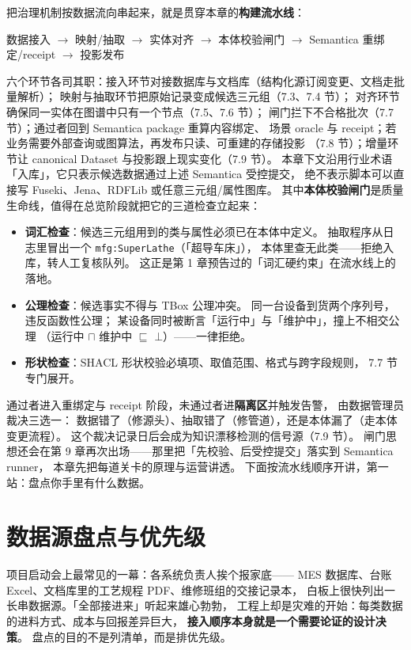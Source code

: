 把治理机制按数据流向串起来，就是贯穿本章的\textbf{构建流水线}：

\begin{center}
数据接入 \(\rightarrow\) 映射/抽取 \(\rightarrow\) 实体对齐 \(\rightarrow\)
本体校验闸门 \(\rightarrow\) Semantica 重绑定/receipt \(\rightarrow\) 投影发布
\end{center}

六个环节各司其职：接入环节对接数据库与文档库（结构化源订阅变更、文档走批量解析）；
映射与抽取环节把原始记录变成候选三元组（7.3、7.4 节）；
对齐环节确保同一实体在图谱中只有一个节点（7.5、7.6 节）；
闸门拦下不合格批次（7.7 节）；通过者回到 Semantica package 重算内容绑定、
场景 oracle 与 receipt；若业务需要外部查询或图算法，再发布只读、可重建的存储投影
（7.8 节）；增量环节让 canonical Dataset 与投影跟上现实变化（7.9 节）。
本章下文沿用行业术语「入库」，它只表示候选数据通过上述 Semantica 受控提交，
绝不表示脚本可以直接写 Fuseki、Jena、RDFLib 或任意三元组/属性图库。
其中\textbf{本体校验闸门}是质量生命线，值得在总览阶段就把它的三道检查立起来：

\begin{itemize}
\item \textbf{词汇检查}：候选三元组用到的类与属性必须已在本体中定义。
  抽取程序从日志里冒出一个 \texttt{mfg:SuperLathe}（「超导车床」），
  本体里查无此类——拒绝入库，转人工复核队列。
  这正是第 1 章预告过的「词汇硬约束」在流水线上的落地。
\item \textbf{公理检查}：候选事实不得与 TBox 公理冲突。
  同一台设备到货两个序列号，违反函数性公理；
  某设备同时被断言「运行中」与「维护中」，撞上不相交公理
  （运行中 \(\sqcap\) 维护中 \(\sqsubseteq\) \(\bot\)）——一律拒绝。
\item \textbf{形状检查}：SHACL 形状校验必填项、取值范围、格式与跨字段规则，
  7.7 节专门展开。
\end{itemize}

通过者进入重绑定与 receipt 阶段，未通过者进\textbf{隔离区}并触发告警，
由数据管理员裁决三选一：
数据错了（修源头）、抽取错了（修管道），还是本体漏了（走本体变更流程）。
这个裁决记录日后会成为知识漂移检测的信号源（7.9 节）。
闸门思想还会在第 9 章再次出场——那里把「先校验、后受控提交」落实到 Semantica runner，
本章先把每道关卡的原理与运营讲透。
下面按流水线顺序开讲，第一站：盘点你手里有什么数据。

\section{数据源盘点与优先级}

项目启动会上最常见的一幕：各系统负责人挨个报家底——
MES 数据库、台账 Excel、文档库里的工艺规程 PDF、维修班组的交接记录本，
白板上很快列出一长串数据源。「全部接进来」听起来雄心勃勃，
工程上却是灾难的开始：每类数据的进料方式、成本与回报差异巨大，
\textbf{接入顺序本身就是一个需要论证的设计决策}。
盘点的目的不是列清单，而是排优先级。

